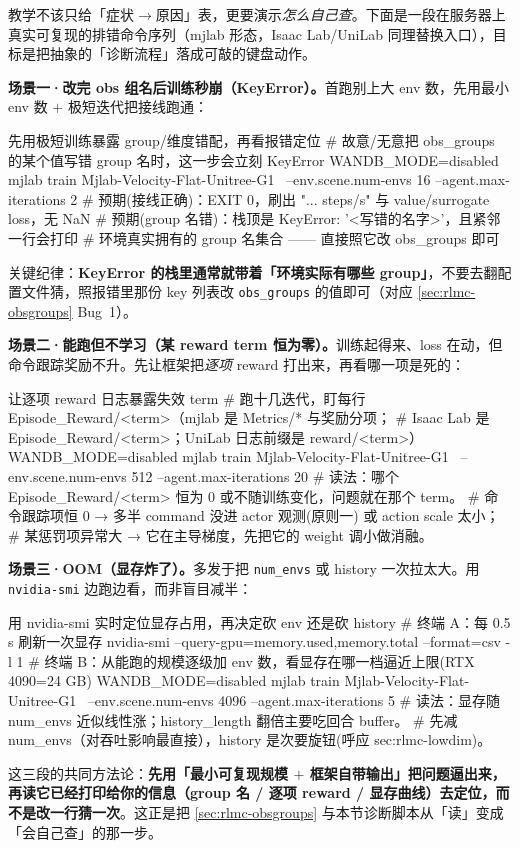 \begin{practice}
教学不该只给「症状$\to$原因」表，更要演示\emph{怎么自己查}。下面是一段在服务器上真实可复现的排错命令序列（mjlab 形态，Isaac Lab/UniLab 同理替换入口），目标是把抽象的「诊断流程」落成可敲的键盘动作。

\textbf{场景一·改完 obs 组名后训练秒崩（KeyError）。}首跑别上大 env 数，先用最小 env 数 $+$ 极短迭代把接线跑通：
\begin{codebox}[bash]{先用极短训练暴露 group/维度错配，再看报错定位}
# 故意/无意把 obs_groups 的某个值写错 group 名时，这一步会立刻 KeyError
WANDB_MODE=disabled mjlab train Mjlab-Velocity-Flat-Unitree-G1 \
    --env.scene.num-envs 16 --agent.max-iterations 2
# 预期(接线正确)：EXIT 0，刷出 "... steps/s" 与 value/surrogate loss，无 NaN
# 预期(group 名错)：栈顶是 KeyError: '<写错的名字>'，且紧邻一行会打印
#                   环境真实拥有的 group 名集合 —— 直接照它改 obs_groups 即可
\end{codebox}
关键纪律：\textbf{KeyError 的栈里通常就带着「环境实际有哪些 group」}，不要去翻配置文件猜，照报错里那份 key 列表改 \verb|obs_groups| 的值即可（对应 \cref{sec:rlmc-obsgroups} Bug~1）。

\textbf{场景二·能跑但不学习（某 reward term 恒为零）。}训练起得来、loss 在动，但命令跟踪奖励不升。先让框架把\emph{逐项} reward 打出来，再看哪一项是死的：
\begin{codebox}[bash]{让逐项 reward 日志暴露失效 term}
# 跑十几迭代，盯每行 Episode_Reward/<term>（mjlab 是 Metrics/* 与奖励分项；
# Isaac Lab 是 Episode_Reward/<term>；UniLab 日志前缀是 reward/<term>）
WANDB_MODE=disabled mjlab train Mjlab-Velocity-Flat-Unitree-G1 \
    --env.scene.num-envs 512 --agent.max-iterations 20
# 读法：哪个 Episode_Reward/<term> 恒为 0 或不随训练变化，问题就在那个 term。
#   命令跟踪项恒 0 → 多半 command 没进 actor 观测(原则一) 或 action scale 太小；
#   某惩罚项异常大 → 它在主导梯度，先把它的 weight 调小做消融。
\end{codebox}

\textbf{场景三·OOM（显存炸了）。}多发于把 \verb|num_envs| 或 history 一次拉太大。用 \verb|nvidia-smi| 边跑边看，而非盲目减半：
\begin{codebox}[bash]{用 nvidia-smi 实时定位显存占用，再决定砍 env 还是砍 history}
# 终端 A：每 0.5 s 刷新一次显存
nvidia-smi --query-gpu=memory.used,memory.total --format=csv -l 1
# 终端 B：从能跑的规模逐级加 env 数，看显存在哪一档逼近上限(RTX 4090=24 GB)
WANDB_MODE=disabled mjlab train Mjlab-Velocity-Flat-Unitree-G1 \
    --env.scene.num-envs 4096 --agent.max-iterations 5
# 读法：显存随 num_envs 近似线性涨；history_length 翻倍主要吃回合 buffer。
#   先减 num_envs（对吞吐影响最直接），history 是次要旋钮(呼应 sec:rlmc-lowdim)。
\end{codebox}
这三段的共同方法论：\textbf{先用「最小可复现规模 $+$ 框架自带输出」把问题逼出来，再读它已经打印给你的信息（group 名 / 逐项 reward / 显存曲线）去定位，而不是改一行猜一次}。这正是把 \cref{sec:rlmc-obsgroups} 与本节诊断脚本从「读」变成「会自己查」的那一步。
\end{practice}

